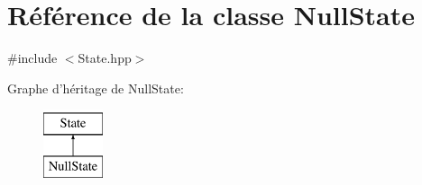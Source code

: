 \hypertarget{class_null_state}{\section{Référence de la classe Null\-State}
\label{class_null_state}
}


{\ttfamily \#include $<$State.\-hpp$>$}

Graphe d'héritage de Null\-State\-:\begin{figure}[H]
\begin{center}
\leavevmode
\includegraphics[height=2.000000cm]{class_null_state}
\end{center}
\end{figure}
